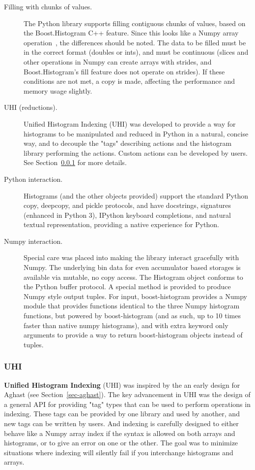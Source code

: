 \documentclass{webofc}
\begin{document}
\begin{description}
\item[Filling with chunks of values.] The Python library supports filling contiguous chunks of values, based on the Boost.Histogram C++ feature. Since this looks like a Numpy array operation~\cite{walt2011numpy}, the differences should be noted. The data to be filled must be in the correct format (doubles or ints), and must be continuous (slices and other operations in Numpy can create arrays with strides, and Boost.Histogram's fill feature does not operate on strides). If these conditions are not met, a copy is made, affecting the performance and memory usage slightly.
\item[UHI (reductions).] Unified Histogram Indexing (UHI) was developed to provide a way for histograms to be manipulated and reduced in Python in a natural, concise way, and to decouple the "tags" describing actions and the histogram library performing the actions. Custom actions can be developed by users. See Section~\ref{sec-bhp-uhi} for more details.
\item[Python interaction.] Histograms (and the other objects provided) support the standard Python copy, deepcopy, and pickle protocols, and have docstrings, signatures (enhanced in Python 3), IPython keyboard completions, and natural textual representation,  providing a native experience for Python.
\item[Numpy interaction.] Special care was placed into making the library interact gracefully with Numpy. The underlying bin data for even accumulator based storages is available via mutable, no copy access. The Histogram object conforms to the Python buffer protocol. A special method is provided to produce Numpy style output tuples. For input, boost-histogram provides a Numpy module that provides functions identical to the three Numpy histogram functions, but powered by boost-histogram (and as such, up to 10 times faster than native numpy histograms), and with extra keyword only arguments to provide a way to return boost-histogram objects instead of tuples.
\end{description}


\subsubsection{UHI}
\label{sec-bhp-uhi}

\textbf{Unified Histogram Indexing} (UHI) was inspired by the an early design for Aghast (see Section~\ref{sec-aghast}). The key advancement in UHI was the design of a general API for providing "tag" types that can be used to perform operations in indexing. These tags can be provided by one library and used by another, and new tags can be written by users. And indexing is carefully designed to either behave like a Numpy array index if the syntax is allowed on both arrays and histograms, or to give an error on one or the other. The goal was to minimize situations where indexing will silently fail if you interchange histograms and arrays.
\end{document}
